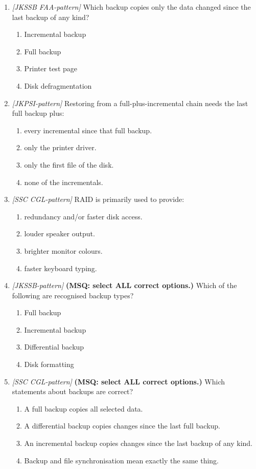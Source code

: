 \documentclass[11pt]{article}
\begin{document}
\begin{enumerate}[label=\textbf{Q\arabic*.}, leftmargin=*]
\item \textit{[JKSSB FAA-pattern]} Which backup copies only the data changed since the last backup of any kind?
  \begin{enumerate}[label=\Alph*.]
    \item Incremental backup
    \item Full backup
    \item Printer test page
    \item Disk defragmentation
  \end{enumerate}
\item \textit{[JKPSI-pattern]} Restoring from a full-plus-incremental chain needs the last full backup plus:
  \begin{enumerate}[label=\Alph*.]
    \item every incremental since that full backup.
    \item only the printer driver.
    \item only the first file of the disk.
    \item none of the incrementals.
  \end{enumerate}
\item \textit{[SSC CGL-pattern]} RAID is primarily used to provide:
  \begin{enumerate}[label=\Alph*.]
    \item redundancy and/or faster disk access.
    \item louder speaker output.
    \item brighter monitor colours.
    \item faster keyboard typing.
  \end{enumerate}
\item \textit{[JKSSB-pattern]} \textbf{(MSQ: select ALL correct options.)} Which of the following are recognised backup types?
  \begin{enumerate}[label=\Alph*.]
    \item Full backup
    \item Incremental backup
    \item Differential backup
    \item Disk formatting
  \end{enumerate}
\item \textit{[SSC CGL-pattern]} \textbf{(MSQ: select ALL correct options.)} Which statements about backups are correct?
  \begin{enumerate}[label=\Alph*.]
    \item A full backup copies all selected data.
    \item A differential backup copies changes since the last full backup.
    \item An incremental backup copies changes since the last backup of any kind.
    \item Backup and file synchronisation mean exactly the same thing.
  \end{enumerate}
\end{enumerate}
\def\JKSSBLessonID{11}\def\JKSSBAnswers{0}
\end{document}
